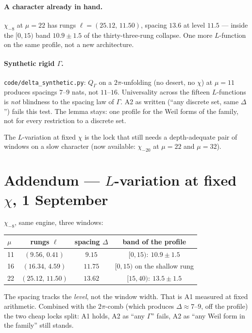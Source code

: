 \documentclass[10pt]{article}
\theoremstyle{definition}
\begin{document}
\paragraph{A character already in hand.} $\chi_{-8}$ at $\mu=22$ has
rungs $\ell=(25.12,\,11.50)$, spacing $13.6$ at level $11.5$ --- inside
the $[0,15)$ band $10.9\pm1.5$ of the thirty-three-rung collapse. One
more $L$-function on the same profile, not a new architecture.

\paragraph{Synthetic rigid $\Gamma$.}
\texttt{code/delta\_synthetic.py}: $Q_\Gamma$ on a $2\pi$-unfolding
(no desert, no $\chi$) at $\mu=11$ produces spacings $7$--$9$ nats,
not $11$--$16$. Universality across the fifteen $L$-functions is
\emph{not} blindness to the spacing law of $\Gamma$. A2 as written
(``any discrete set, same $\Delta$'') fails this test. The lemma
stays: one profile for the Weil forms of the family, not for every
restriction to a discrete set.

The $L$-variation at fixed $\chi$ is the lock that still needs a
depth-adequate pair of windows on a slow character (now available:
$\chi_{-20}$ at $\mu=22$ and $\mu=32$).

\section*{Addendum --- $L$-variation at fixed $\chi$, 1 September}

$\chi_{-8}$, same engine, three windows:

\begin{center}\small
\begin{tabular}{lccc}
\toprule
$\mu$ & rungs $\ell$ & spacing $\Delta$ & band of the profile \\
\midrule
11 & $(9.56,\,0.41)$ & $9.15$ & $[0,15):\ 10.9\pm1.5$ \\
16 & $(16.34,\,4.59)$ & $11.75$ & $[0,15)$ on the shallow rung \\
22 & $(25.12,\,11.50)$ & $13.62$ & $[15,40):\ 13.5\pm1.5$ \\
\bottomrule
\end{tabular}
\end{center}
The spacing tracks the \emph{level}, not the window width. That is A1
measured at fixed arithmetic. Combined with the $2\pi$-comb (which
produces $\Delta\approx7$--$9$, off the profile) the two cheap locks
split: A1 holds, A2 as ``any $\Gamma$'' fails, A2 as ``any Weil form
in the family'' still stands.
\end{document}
